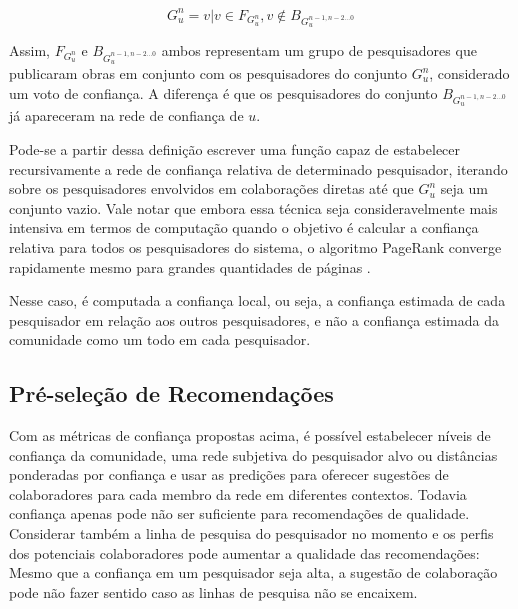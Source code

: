 \documentclass[12pt]{article}
\begin{document}
\begin{equation} \label{eqn:subjective-network}
 G_{u}^{n} = v | v \in F_{G_{u}^{n}}, v \notin B_{G_{u}^{n-1, n-2 \dots 0}}
\end{equation}

Assim, $F_{G_{u}^{n}}$ e $B_{G_{u}^{n-1, n-2 \dots 0}}$ ambos  representam um grupo de pesquisadores que publicaram obras em conjunto 
com os pesquisadores do conjunto $G_{u}^{n}$, considerado um voto de  confiança. A diferença é que os pesquisadores do conjunto 
$B_{G_u^{n-1, n-2 \dots 0}}$ já apareceram na rede de confiança de $u$.

Pode-se a partir dessa definição escrever uma função capaz de estabelecer recursivamente a rede de confiança relativa de 
determinado pesquisador, iterando sobre os pesquisadores envolvidos  em colaborações diretas até que $ G^{n}_{u} $ seja um 
conjunto vazio. Vale notar que embora essa técnica seja consideravelmente mais intensiva em termos de computação quando o objetivo 
é calcular a confiança relativa para todos os pesquisadores do sistema, o algoritmo PageRank converge rapidamente mesmo para 
grandes quantidades de páginas \cite{page1999pagerank}.

Nesse caso, é computada a confiança local, ou seja, a confiança estimada de cada pesquisador em relação aos outros pesquisadores, 
e não a confiança estimada da comunidade como um todo em cada pesquisador.

\subsection{Pré-seleção de Recomendações} \label{sect:pre-selection}

Com as métricas de confiança propostas acima, é possível estabelecer níveis de confiança da comunidade, uma rede subjetiva do 
pesquisador alvo ou distâncias ponderadas por confiança e usar as predições para oferecer sugestões de colaboradores para cada 
membro da rede em diferentes contextos. Todavia confiança apenas pode não ser suficiente para recomendações de qualidade. 
Considerar também a linha de pesquisa do pesquisador no momento e os perfis dos potenciais colaboradores pode aumentar a qualidade 
das recomendações: Mesmo que a confiança em um pesquisador seja alta, a sugestão de colaboração pode não fazer sentido caso as 
linhas de pesquisa não se encaixem.
\end{document}
